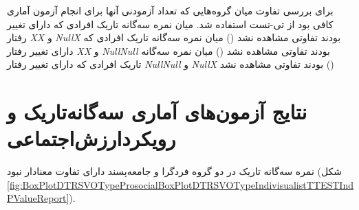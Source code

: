 برای بررسی تفاوت میان گروه‌هایی که تعداد آزمودنی آنها برای انجام آزمون آماری کافی بود از تی-تست استفاده شد.
میان نمره سه‌گانه تاریک افرادی که دارای تغییر رفتار
\textit{\gls{XX}}
و
\textit{\gls{NullX}}
بودند تفاوتی مشاهده نشد
(\XYNullDarkTriadXXXYNullDarkTriadNullXTTestPValueReport)
میان نمره سه‌گانه تاریک افرادی که دارای تغییر رفتار
\textit{\gls{XX}}
و
\textit{\gls{NullNull}}
بودند تفاوتی مشاهده نشد
(\XYNullDarkTriadXXXYNullDarkTriadNullNullTTestPValueReport)
میان نمره سه‌گانه تاریک افرادی که دارای تغییر رفتار
\textit{\gls{NullNull}}
و
\textit{\gls{NullX}}
بودند تفاوتی مشاهده نشد
(\XYNullDarkTriadNullXXYNullDarkTriadNullNullTTestPValueReport)








\section{نتایج آزمون‌های آماری سه‌گانه‌تاریک و رویکرد‌ارزش‌اجتماعی}

نمره سه‌گانه تاریک در دو گروه  فرد‌گرا و جامعه‌پسند دارای تفاوت معنادار نبود
(شکل
\ref{fig:BoxPlotDTRSVOTypeProsocialBoxPlotDTRSVOTypeIndivisualistTTESTIndPValueReport}).

